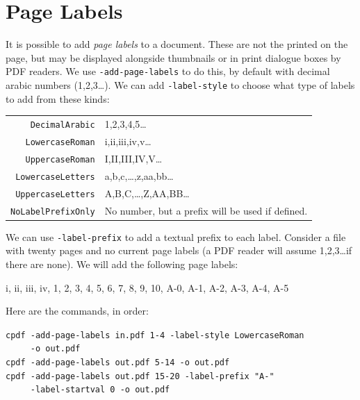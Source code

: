 \documentclass[a4paper,makeidx]{memoir}
\begin{document}
\section{Page Labels}

It is possible to add \textit{page labels} to a document. These are not the printed on the page, but may be displayed alongside thumbnails or in print dialogue boxes by PDF readers. We use \texttt{-add-page-labels} to do this, by default with decimal arabic numbers (1,2,3\ldots). We can add \texttt{-label-style} to choose what type of labels to add from these kinds:

\vspace{4mm}
\begin{tabular}{rl}
  \texttt{DecimalArabic} & 1,2,3,4,5\ldots \\
  \texttt{LowercaseRoman} & i,ii,iii,iv,v\ldots \\
  \texttt{UppercaseRoman} & I,II,III,IV,V\ldots \\
  \texttt{LowercaseLetters} & a,b,c,\ldots,z,aa,bb\ldots \\
  \texttt{UppercaseLetters} & A,B,C,\ldots,Z,AA,BB\ldots \\
  \texttt{NoLabelPrefixOnly} & No number, but a prefix will be used if defined.
\end{tabular}
\vspace{4mm}

\noindent We can use \texttt{-label-prefix} to add a textual prefix to each label. 
Consider a file with twenty pages and no current page labels (a PDF reader will assume 1,2,3\ldots if there are none). We will add the following page labels:

\vspace{4mm}
i, ii, iii, iv, 1, 2, 3, 4, 5, 6, 7, 8, 9, 10, A-0, A-1, A-2, A-3, A-4, A-5
\vspace{4mm}

\noindent Here are the commands, in order:

\begin{framed}
  \noindent\verb!cpdf -add-page-labels in.pdf 1-4 -label-style LowercaseRoman!\\
  \noindent\verb!     -o out.pdf!\\
  
  \noindent\verb!cpdf -add-page-labels out.pdf 5-14 -o out.pdf!\\

  \noindent\verb!cpdf -add-page-labels out.pdf 15-20 -label-prefix "A-"!\\
  \noindent\verb!     -label-startval 0 -o out.pdf!
\end{framed}
\end{document}
